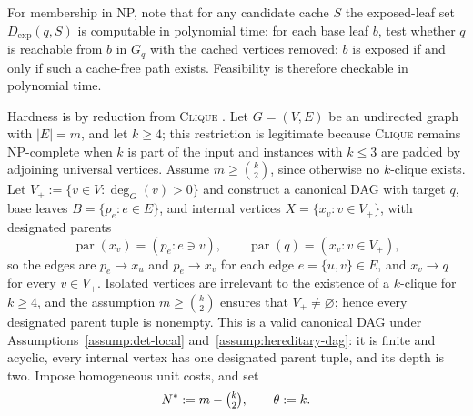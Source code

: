\documentclass[journal]{IEEEtran}
\makeatletter
\numberwithin{equation}{section}
\renewenvironment{proof}[1][\proofname]{\par
  \pushQED{\qed}%
  \normalfont \topsep6\p@\@plus6\p@\relax
  \trivlist
  \item[\hskip\labelsep
        \itshape
    #1\@addpunct{.}]\ignorespaces
}{%
  \popQED\endtrivlist\@endpefalse
}
\makeatother
\begin{document}
\begin{proof}
For membership in NP, note that for any candidate cache \(S\) the exposed-leaf
set \(D_{\mathrm{exp}}(q,S)\) is computable in polynomial time: for each base
leaf \(b\), test whether \(q\) is reachable from \(b\) in \(G_q\) with the
cached vertices removed; \(b\) is exposed if and only if such a cache-free
path exists.  Feasibility is therefore checkable in polynomial time.

Hardness is by reduction from \textsc{Clique} \cite{garey1979computers}.  Let
\(G=(V,E)\) be an undirected graph with \(|E|=m\), and let \(k\ge 4\);
this restriction is legitimate because \textsc{Clique} remains NP-complete
when \(k\) is part of the input and instances with \(k\le3\) are padded by
adjoining universal vertices.  Assume
\(m\ge\binom{k}{2}\), since otherwise no \(k\)-clique exists.  Let
\(V_{+}:=\{v\in V:\deg_G(v)>0\}\) and construct a canonical DAG with target
\(q\), base leaves \(B=\{p_e:e\in E\}\), and internal vertices
\(X=\{x_v:v\in V_{+}\}\), with designated parents
\[
  \operatorname{par}(x_v)=(p_e:e\ni v),
  \qquad
  \operatorname{par}(q)=(x_v:v\in V_{+}),
\]
so the edges are \(p_e\to x_u\) and \(p_e\to x_v\) for each edge
\(e=\{u,v\}\in E\), and \(x_v\to q\) for every \(v\in V_{+}\).  Isolated
vertices are irrelevant to the existence of a \(k\)-clique for \(k\ge4\),
and the assumption \(m\ge\binom{k}{2}\) ensures that
\(V_{+}\neq\varnothing\); hence every designated parent tuple is nonempty.
This is a valid canonical DAG under Assumptions~\ref{assump:det-local}
and~\ref{assump:hereditary-dag}: it is finite and acyclic, every internal
vertex has one designated parent tuple, and its depth is two.  Impose
homogeneous unit costs, and set
\[
  N^{*}:=m-\tbinom{k}{2},
  \qquad
  \theta:=k.
\]


\end{proof}
\end{document}
